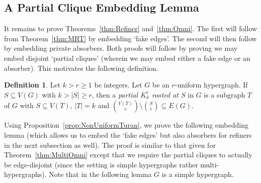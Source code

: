 \documentclass[11pt]{article}
\newcounter{i}
\theoremstyle{plain}
\theoremstyle{plain} %
\theoremstyle{definition}
\newtheorem{definition}[thm]{Definition}
\begin{document}
\subsection{A Partial Clique Embedding Lemma}\label{ss:PartialClique}

It remains to prove Theorems~\ref{thm:Refiner} and~\ref{thm:Omni}. The first will follow from Theorem~\ref{thm:MRT} by embedding `fake edges'. The second will then follow by embedding private absorbers. Both proofs will follow by proving we may embed disjoint `partial cliques' (wherein we may embed either a fake edge or an absorber). This motivates the following definition.

\begin{definition}
Let $k> r\ge 1$ be integers. Let $G$ be an $r$-uniform hypergraph. If $S\subseteq V(G)$ with $k > |S|\ge r$, then a \emph{partial $K_k^r$ rooted at $S$} in $G$ is a subgraph $T$ of $G$ with $S\subseteq V(T)$, $|T|=k$ and $\binom{V(T)}{r}\setminus \binom{S}{r} \subseteq E(G)$.     
\end{definition}

Using Proposition~\ref{prop:NonUniformTuran}, we prove the following embedding lemma (which allows us to embed the `fake edges' but also absorbers for refiners in the next subsection as well). The proof is similar to that given for Theorem~\ref{thm:MultiOmni} except that we require the partial cliques to actually be edge-disjoint (since the setting is simple hypergraphs rather multi-hypergraphs). Note that in the following lemma $G$ is a simple hypergraph.
\end{document}
